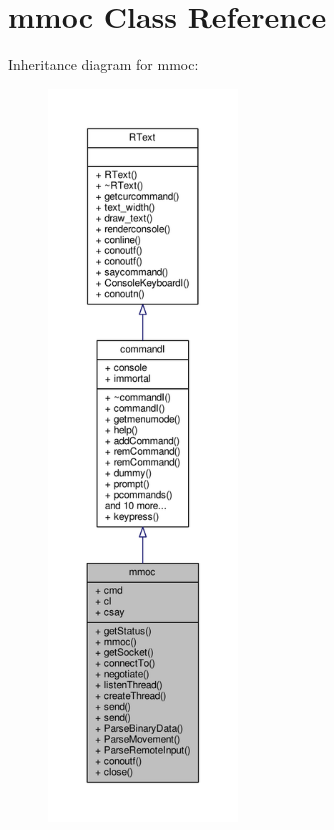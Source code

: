 \hypertarget{classmmoc}{}\section{mmoc Class Reference}
\label{classmmoc}


Inheritance diagram for mmoc\+:
\nopagebreak
\begin{figure}[H]
\begin{center}
\leavevmode
\includegraphics[height=550pt]{de/dc1/classmmoc__inherit__graph}
\end{center}
\end{figure}


